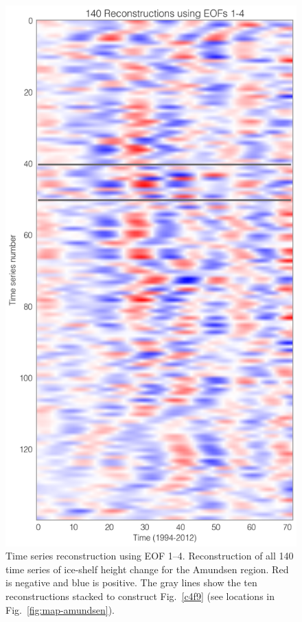 \begin{figure}[!ht]
  \centering
  \includegraphics[width=.72\textwidth]{img/amu_rc1234_all.png}
  \caption[Time series reconstruction using EOF 1--4]{
  \ssp \footnotesize
  Time series reconstruction using EOF 1--4. Reconstruction of all 140 time series of ice-shelf height change for the Amundsen region. Red is negative and blue is positive. The gray lines show the ten reconstructions stacked to construct Fig.~\ref{c4f9} (see locations in Fig.~\ref{fig:map-amundsen}).
  }
  \label{fig:rc1234-all}
\end{figure}


